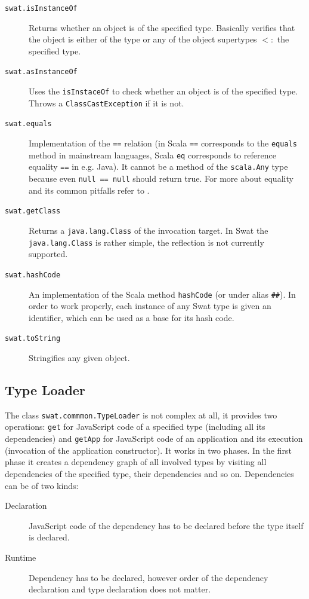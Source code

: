 \documentclass[12pt,a4paper]{report}
\begin{document}
\begin{description}
\item[\texttt{swat.isInstanceOf}] Returns whether an object is of the specified type. Basically verifies that the object is either of the type or any of the object supertypes $<:$ the specified type.
\item[\texttt{swat.asInstanceOf}] Uses the \texttt{isInstaceOf} to check whether an object is of the specified type. Throws a \texttt{ClassCastException} if it is not.
\item[\texttt{swat.equals}] Implementation of the \texttt{==} relation (in Scala \texttt{==} corresponds to the \texttt{equals} method in mainstream languages, Scala \texttt{eq} corresponds to reference equality \texttt{==} in e.g. Java). It cannot be a method of the \texttt{scala.Any} type because even \texttt{null == null} should return true. For more about equality and its common pitfalls refer to \cite{Equality}.
\item[\texttt{swat.getClass}] Returns a \texttt{java.lang.Class} of the invocation target. In Swat the \texttt{java.lang.Class} is rather simple, the reflection is not currently supported. 
\item[\texttt{swat.hashCode}] An implementation of the Scala method \texttt{hashCode} (or under alias \texttt{\#\#}). In order to work properly, each instance of any Swat type is given an identifier, which can be used as a base for its hash code.
\item[\texttt{swat.toString}] Stringifies any given object.
\end{description}

\subsection{Type Loader}

The class \texttt{swat.commmon.TypeLoader} is not complex at all, it provides two operations: \texttt{get} for JavaScript code of a specified type (including all its dependencies) and \texttt{getApp} for JavaScript code of an application and its execution (invocation of the application constructor). It works in two phases. In the first phase it creates a dependency graph of all involved types by visiting all dependencies of the specified type, their dependencies and so on. Dependencies can be of two kinds:

\begin{description}
\item[Declaration] JavaScript code of the dependency has to be declared before the type itself is declared.
\item[Runtime] Dependency has to be declared, however order of the dependency declaration and type declaration does not matter.
\end{description}
\end{document}
